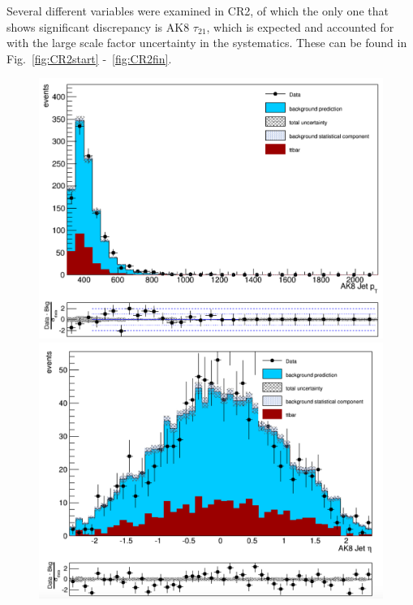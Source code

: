 Several different variables were examined in CR2, of which the only one that shows significant discrepancy is AK8 $\tau_{21}$, which is expected and accounted for with the large scale factor uncertainty in the systematics. These can be found in Fig.~\ref{fig:CR2start} -~\ref{fig:CR2fin}.

\begin{figure}[thb!]
\begin{center}
\includegraphics[scale=0.35]{Figures/AK8ptCR2.pdf}
\includegraphics[scale=0.35]{Figures/AK8etaCR2.pdf}\\

\end{center}
\end{figure}
